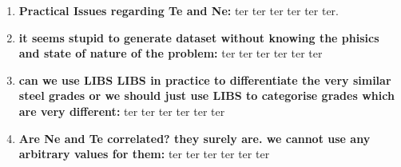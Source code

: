 \documentclass[12pt,a4paper]{article}
\begin{document}
\begin{enumerate}[label=\textbullet]
		\item \textbf{Practical Issues regarding Te and Ne:}  
		ter ter ter ter ter ter.
		
		\item \textbf{it seems stupid to generate dataset without knowing the phisics and state of nature of the problem:}  
		ter ter ter ter ter ter
		
		\item \textbf{can we use LIBS LIBS in practice to differentiate the very similar steel grades or we should just use LIBS to categorise grades which are very different:}  
		ter ter ter ter ter ter
		
		\item \textbf{Are Ne and Te correlated? they surely are. we cannot use any arbitrary values for them:}  
		ter ter ter ter ter ter
		
	\end{enumerate}
	
	
	
	
%	
	
	
\end{document}
